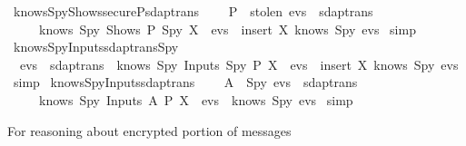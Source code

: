 \begin{isabellebody}
  \endisatagproof
  {\isafoldproof}%
  \isadelimproof
  \isanewline
  \endisadelimproof
  \isanewline
  \isamarkupfalse%
  \ knows{\isacharunderscore}Spy{\isacharunderscore}Shows{\isacharunderscore}secureP{\isacharunderscore}sdaptrans\ {\isacharcolon}\isanewline
  \ \ {\isachardoublequoteopen}{\isasymlbrakk}\ P\ {\isasymin}\ stolen{\isacharsemicolon}\ evs\ {\isasymin}\ sdaptrans\ {\isasymrbrakk}\isanewline
  \ \ \ \ {\isasymLongrightarrow}\ knows\ Spy\ {\isacharparenleft}Shows\ P\ Spy\ X\ {\isacharhash}\ evs{\isacharparenright}\ {\isacharequal}\ insert\ X\ {\isacharparenleft}knows\ Spy\ evs{\isacharparenright}{\isachardoublequoteclose}\isanewline
  \isadelimproof
  \endisadelimproof
  \isatagproof
  \isamarkupfalse%
  \ simp%
  \endisatagproof
  {\isafoldproof}%
  \isadelimproof
  \isanewline
  \endisadelimproof
  \isanewline
  \isamarkupfalse%
  \ knows{\isacharunderscore}Spy{\isacharunderscore}Inputs{\isacharunderscore}sdaptrans{\isacharunderscore}Spy\ {\isacharcolon}\isanewline
  \ \ {\isachardoublequoteopen}evs\ {\isasymin}\ sdaptrans\ {\isasymLongrightarrow}\ knows\ Spy\ {\isacharparenleft}Inputs\ Spy\ P\ X\ {\isacharhash}\ evs{\isacharparenright}\ {\isacharequal}\ insert\ X\ {\isacharparenleft}knows\ Spy\ evs{\isacharparenright}{\isachardoublequoteclose}\isanewline
  \isadelimproof
  \endisadelimproof
  \isatagproof
  \isamarkupfalse%
  \ simp%
  \endisatagproof
  {\isafoldproof}%
  \isadelimproof
  \isanewline
  \endisadelimproof
  \isanewline
  \isamarkupfalse%
  \ knows{\isacharunderscore}Spy{\isacharunderscore}Inputs{\isacharunderscore}sdaptrans\ {\isacharcolon}\isanewline
  \ \ {\isachardoublequoteopen}{\isasymlbrakk}\ A\ {\isasymnoteq}\ Spy{\isacharsemicolon}\ evs\ {\isasymin}\ sdaptrans\ {\isasymrbrakk}\ \isanewline
  \ \ \ \ {\isasymLongrightarrow}\ knows\ Spy\ {\isacharparenleft}Inputs\ A\ P\ X\ {\isacharhash}\ evs{\isacharparenright}\ {\isacharequal}\ knows\ Spy\ evs{\isachardoublequoteclose}\isanewline
  \isadelimproof
  \endisadelimproof
  \isatagproof
  \isamarkupfalse%
  \ simp%
  \endisatagproof
  {\isafoldproof}%
  \isadelimproof
  \endisadelimproof
  \isadelimdocument
  \endisadelimdocument
  \isatagdocument
  \isamarkuptrue%
  \endisatagdocument
  {\isafolddocument}%
  \isadelimdocument
  \endisadelimdocument
  \begin{isamarkuptext}%
  For reasoning about encrypted portion of messages%

\end{isamarkuptext}
\end{isabellebody}
